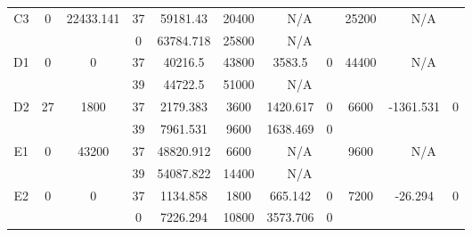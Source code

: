 \begin{sidewaystable}
\begin{tabular}{c||c|c||c|c|c|c|c||c|c|c}
         &
        
      \\
      \hline
      \multirow{2}{*}{C3} &
      \multirow{2}{*}{0} &
      \multirow{2}{*}{22433.141} &
      37 &
      59181.43 &
      20400 &
        \multicolumn{2}{|c||}{N/A} &
      \multirow{2}{*}{25200} &
        \multicolumn{2}{c}{\multirow{2}{*}{N/A}}
      \\
      \cline{4-8}
       &
       &
       &
      0 &
      63784.718 &
      25800 &
        \multicolumn{2}{|c||}{N/A} &
      
        
      \\
      \hline
      \multirow{2}{*}{D1} &
      \multirow{2}{*}{0} &
      \multirow{2}{*}{0} &
      37 &
      40216.5 &
      43800 &
        3583.5 &
        0 &
      \multirow{2}{*}{44400} &
        \multicolumn{2}{c}{\multirow{2}{*}{N/A}}
      \\
      \cline{4-8}
       &
       &
       &
      39 &
      44722.5 &
      51000 &
        \multicolumn{2}{|c||}{N/A} &
      
        
      \\
      \hline
      \multirow{2}{*}{D2} &
      \multirow{2}{*}{27} &
      \multirow{2}{*}{1800} &
      37 &
      2179.383 &
      3600 &
        1420.617 &
        0 &
      \multirow{2}{*}{6600} &
        \multirow{2}{*}{-1361.531} &
        \multirow{2}{*}{0}
      \\
      \cline{4-8}
       &
       &
       &
      39 &
      7961.531 &
      9600 &
        1638.469 &
        0 &
      
         &
        
      \\
      \hline
      \multirow{2}{*}{E1} &
      \multirow{2}{*}{0} &
      \multirow{2}{*}{43200} &
      37 &
      48820.912 &
      6600 &
        \multicolumn{2}{|c||}{N/A} &
      \multirow{2}{*}{9600} &
        \multicolumn{2}{c}{\multirow{2}{*}{N/A}}
      \\
      \cline{4-8}
       &
       &
       &
      39 &
      54087.822 &
      14400 &
        \multicolumn{2}{|c||}{N/A} &
      
        
      \\
      \hline
      \multirow{2}{*}{E2} &
      \multirow{2}{*}{0} &
      \multirow{2}{*}{0} &
      37 &
      1134.858 &
      1800 &
        665.142 &
        0 &
      \multirow{2}{*}{7200} &
        \multirow{2}{*}{-26.294} &
        \multirow{2}{*}{0}
      \\
      \cline{4-8}
       &
       &
       &
      0 &
      7226.294 &
      10800 &
        3573.706 &
        0 &
      

\end{tabular}
\end{sidewaystable}
